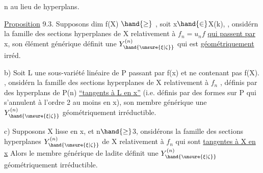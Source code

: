
n  au lieu de  hyperplans.

\uline{Proposition} 9.3.  Supposons  dim f(X) $\hand{\geq}$ ,  soit x$\hand{\in}$X(k),  
  , onsidérn la famille  des sections hyperplanes
de X relativement à $f_n=u_nf$ \uline{qui passent par} x, son élément
générique  définit une $Y^{(n)}_{\hand{\unsure{\xi|\zeta}}}$ qui est \uline{géométriquement} irréd.

b) 
 Soit L une sous-variété linéaire de P passant par f(x) et
ne contenant pas f(X). , onsidérn la famille  des
sections hyperplanes de X relativement à  $f_n$  , définis
par des hyperplans de P(n)  \uline{``tangents à L en x''} (i.e. définis
par des formes sur P qui  s'annulent à l'ordre 2 au moins en x), son
membre générique   une $Y^{(n)}_{\hand{\unsure{\xi|\zeta}}}$ géométriquement irréductible.

c) Supposons X lisse en x,  et  n$\hand{\geq}$3,   onsidérons
la famille des sections hyperplanes   $Y^{(n)}_{\hand{\unsure{\xi|\zeta}}}$ de X relativement
à $f_n$ qui sont \uline{tangentes à X en x} Alors le membre générique de ladite
définit une $Y^{(n)}_{\hand{\unsure{\xi|\zeta}}}$ géométriquement irréductible.

